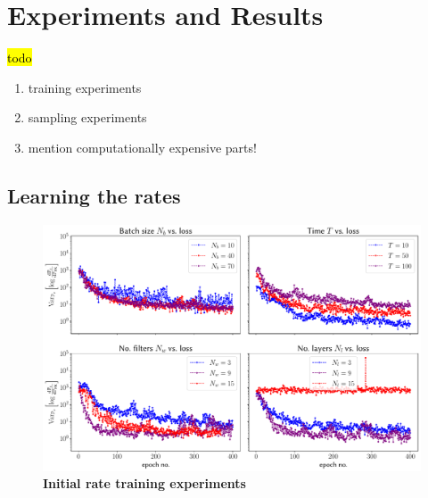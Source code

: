 \ifpdf
\graphicspath{{Chapter5/Figs/Raster/}{Chapter5/Figs/PDF/}{Chapter5/Figs/}}
\else
\graphicspath{{Chapter5/Figs/Vector/}{Chapter5/Figs/}}
\fi


\chapter{Experiments and Results}
\label{chapter5}
\hl{todo}
\begin{enumerate}
	\item training experiments
	\item sampling experiments
	\item mention computationally expensive parts!
\end{enumerate}

\section{Learning the rates} 
\begin{figure}
	\centering
	\includegraphics[width=\linewidth]{Chapter5/Figs/Vector/init_test_learning}
	\caption[Initial rate training experiments]{\textbf{Initial rate training experiments}}
	\label{fig:inittestlearning}
\end{figure}

